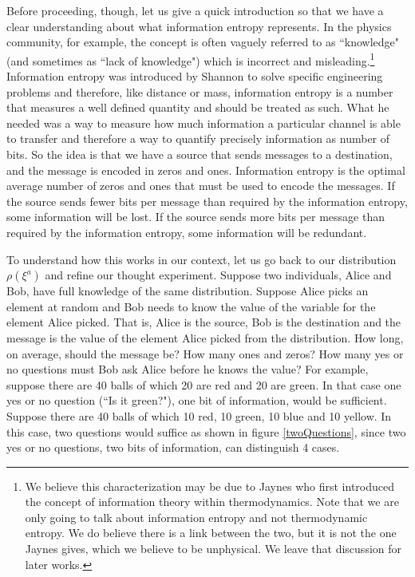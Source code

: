 \documentclass[11pt]{article}
\begin{document}
Before proceeding, though, let us give a quick introduction so that we have a clear understanding about what information entropy represents. In the physics community, for example, the concept is often vaguely referred to as ``knowledge" (and sometimes as ``lack of knowledge") which is incorrect and misleading.\footnote{We believe this characterization may be due to Jaynes\cite{Jaynes} who first introduced the concept of information theory within thermodynamics. Note that we are only going to talk about information entropy and not thermodynamic entropy. We do believe there is a link between the two, but it is not the one Jaynes gives, which we believe to be unphysical. We leave that discussion for later works.} Information entropy was introduced by Shannon\cite{Shannon} to solve specific engineering problems and therefore, like distance or mass, information entropy is a number that measures a well defined quantity and should be treated as such. What he needed was a way to measure how much information a particular channel is able to transfer and therefore a way to quantify precisely information as number of bits. So the idea is that we have a source that sends messages to a destination, and the message is encoded in zeros and ones. Information entropy is the optimal average number of zeros and ones that must be used to encode the messages. If the source sends fewer bits per message than required by the information entropy, some information will be lost. If the source sends more bits per message than required by the information entropy, some information will be redundant.

To understand how this works in our context, let us go back to our distribution $\rho(\xi^a)$ and refine our thought experiment. Suppose two individuals, Alice and Bob, have full knowledge of the same distribution. Suppose Alice picks an element at random and Bob needs to know the value of the variable for the element Alice picked. That is, Alice is the source, Bob is the destination and the message is the value of the element Alice picked from the distribution. How long, on average, should the message be? How many ones and zeros? How many yes or no questions must Bob ask Alice before he knows the value? For example, suppose there are 40 balls of which 20 are red and 20 are green. In that case one yes or no question (``Is it green?"), one bit of information, would be sufficient. Suppose there are 40 balls of which 10 red, 10 green, 10 blue and 10 yellow. In this case, two questions would suffice as shown in figure \ref{twoQuestions}, since two yes or no questions, two bits of information, can distinguish 4 cases.
\end{document}

